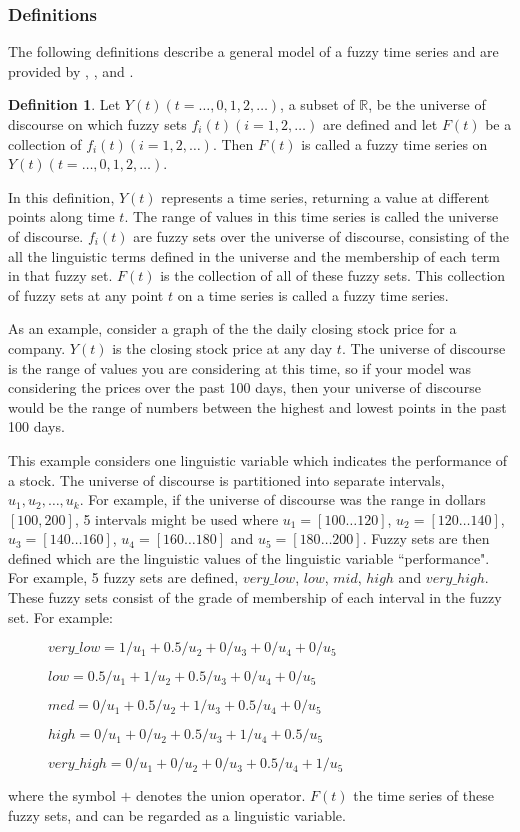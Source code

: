\documentclass{article}
\theoremstyle{definition}
\newtheorem{ftsdef}{Definition}
\begin{document}
\subsubsection{Definitions}

The following definitions describe a general model of a fuzzy time series and are provided by \cite{song1993forecasting}, \cite{chen1996forecasting}, \cite{chen2002forecasting} and \cite{chu2009fuzzy}.

\begin{ftsdef}
Let $Y(t)(t= \ldots,0,1,2, \ldots)$, a subset of $\mathbb{R}$, be the universe of discourse on which fuzzy sets $f_i(t)(i=1,2,\ldots)$ are defined and let $F(t)$ be a collection of $f_i(t)(i=1,2,\ldots)$. Then $F(t)$ is called a fuzzy time series on $Y(t)(t= \ldots,0,1,2, \ldots)$.
\end{ftsdef}
In this definition, $Y(t)$ represents a time series, returning a value at different points along time $t$. The range of values in this time series is called the universe of discourse. $f_i(t)$ are fuzzy sets over the universe of discourse, consisting of the all the linguistic terms defined in the universe and the membership of each term in that fuzzy set. $F(t)$ is the collection of all of these fuzzy sets. This collection of fuzzy sets at any point $t$ on a time series is called a fuzzy time series.

As an example, consider a graph of the the daily closing stock price for a company. $Y(t)$ is the closing stock price at any day $t$. The universe of discourse is the range of values you are considering at this time, so if your model was considering the prices over the past 100 days, then your universe of discourse would be the range of numbers between the highest and lowest points in the past 100 days. 

This example considers one linguistic variable which indicates the performance of a stock. The universe of discourse is partitioned into separate intervals, $u_1, u_2,\ldots,u_k$. For example, if the universe of discourse was the range in dollars $[100, 200]$, 5 intervals might be used where $u_1 = [100 \ldots 120]$, $u_2 = [120 \ldots 140]$, $u_3 = [140 \ldots 160]$, $u_4 = [160 \ldots 180]$ and $u_5 = [180 \ldots 200]$. Fuzzy sets are then defined which are the linguistic values of the linguistic variable ``performance". For example, 5 fuzzy sets are defined, $very\_low$, $low$, $mid$, $high$ and $very\_high$. These fuzzy sets consist of the grade of membership of each interval in the fuzzy set. For example:
\begin{description}
\item[] $very\_low = 1/u_1 + 0.5/u_2 + 0/u_3 + 0/u_4 + 0/u_5$
\item[] $low = 0.5/u_1 + 1/u_2 + 0.5/u_3 + 0/u_4 + 0/u_5$
\item[] $med = 0/u_1 + 0.5/u_2 + 1/u_3 + 0.5/u_4 + 0/u_5$
\item[] $high = 0/u_1 + 0/u_2 + 0.5/u_3 + 1/u_4 + 0.5/u_5$
\item[] $very\_high = 0/u_1 + 0/u_2 + 0/u_3 + 0.5/u_4 + 1/u_5$
\end{description}
where the symbol $+$ denotes the union operator. $F(t)$ the time series of these fuzzy sets, and can be regarded as a linguistic variable.
\end{document}
